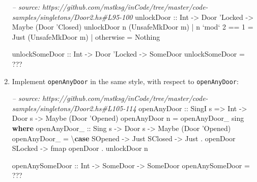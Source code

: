 \documentclass[]{article}
\newenvironment{Shaded}{}{}
\newcommand{\KeywordTok}[1]{\textcolor[rgb]{0.00,0.44,0.13}{\textbf{#1}}}
\newcommand{\DataTypeTok}[1]{\textcolor[rgb]{0.56,0.13,0.00}{#1}}
\newcommand{\DecValTok}[1]{\textcolor[rgb]{0.25,0.63,0.44}{#1}}
\newcommand{\CharTok}[1]{\textcolor[rgb]{0.25,0.44,0.63}{#1}}
\newcommand{\CommentTok}[1]{\textcolor[rgb]{0.38,0.63,0.69}{\textit{#1}}}
\newcommand{\OtherTok}[1]{\textcolor[rgb]{0.00,0.44,0.13}{#1}}
\newcommand{\FunctionTok}[1]{\textcolor[rgb]{0.02,0.16,0.49}{#1}}
\newcommand{\NormalTok}[1]{#1}
\begin{document}
\begin{enumerate}
\begin{Shaded}
\begin{Highlighting}[]
\CommentTok{-- source: https://github.com/mstksg/inCode/tree/master/code-samples/singletons/Door2.hs#L95-100}
\OtherTok{unlockDoor ::} \DataTypeTok{Int} \OtherTok{->} \DataTypeTok{Door} \CharTok{'Locked -> Maybe (Door '}\DataTypeTok{Closed}\NormalTok{)}
\NormalTok{unlockDoor n (}\DataTypeTok{UnsafeMkDoor}\NormalTok{ m)}
    \FunctionTok{|}\NormalTok{ n }\OtherTok{`mod`} \DecValTok{2} \FunctionTok{==} \DecValTok{1} \FunctionTok{=} \DataTypeTok{Just}\NormalTok{ (}\DataTypeTok{UnsafeMkDoor}\NormalTok{ m)}
    \FunctionTok{|}\NormalTok{ otherwise      }\FunctionTok{=} \DataTypeTok{Nothing}

\OtherTok{unlockSomeDoor ::} \DataTypeTok{Int} \OtherTok{->} \DataTypeTok{Door} \CharTok{'Locked -> SomeDoor}
\NormalTok{unlockSomeDoor }\FunctionTok{=} \FunctionTok{???}
\end{Highlighting}
\end{Shaded}
\item
  Implement \texttt{openAnyDoor\textquotesingle{}} in the same style, with
  respect to \texttt{openAnyDoor}:

\begin{Shaded}
\begin{Highlighting}[]
\CommentTok{-- source: https://github.com/mstksg/inCode/tree/master/code-samples/singletons/Door2.hs#L105-114}
\OtherTok{openAnyDoor ::} \DataTypeTok{SingI}\NormalTok{ s }\OtherTok{=>} \DataTypeTok{Int} \OtherTok{->} \DataTypeTok{Door}\NormalTok{ s }\OtherTok{->} \DataTypeTok{Maybe}\NormalTok{ (}\DataTypeTok{Door} \CharTok{'Opened)}
\NormalTok{openAnyDoor n }\FunctionTok{=}\NormalTok{ openAnyDoor_ sing}
  \KeywordTok{where}
\OtherTok{    openAnyDoor_ ::} \DataTypeTok{Sing}\NormalTok{ s }\OtherTok{->} \DataTypeTok{Door}\NormalTok{ s }\OtherTok{->} \DataTypeTok{Maybe}\NormalTok{ (}\DataTypeTok{Door} \CharTok{'Opened)}
\NormalTok{    openAnyDoor_ }\FunctionTok{=}\NormalTok{ \textbackslash{}}\KeywordTok{case}
      \DataTypeTok{SOpened} \OtherTok{->} \DataTypeTok{Just}
      \DataTypeTok{SClosed} \OtherTok{->} \DataTypeTok{Just} \FunctionTok{.}\NormalTok{ openDoor}
      \DataTypeTok{SLocked} \OtherTok{->}\NormalTok{ fmap openDoor }\FunctionTok{.}\NormalTok{ unlockDoor n}

\OtherTok{openAnySomeDoor ::} \DataTypeTok{Int} \OtherTok{->} \DataTypeTok{SomeDoor} \OtherTok{->} \DataTypeTok{SomeDoor}
\NormalTok{openAnySomeDoor }\FunctionTok{=} \FunctionTok{???}
\end{Highlighting}
\end{Shaded}


\end{enumerate}
\end{document}
